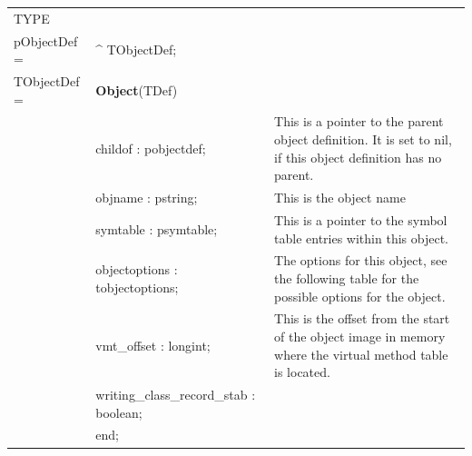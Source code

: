 \documentclass [12pt]{article}
\begin{document}
\begin{tabular*}{6.5in}{|l@{\extracolsep{\fill}}lp{6cm}|}
\hline
\textsf{TYPE}& & \\
\xspace pObjectDef = & \^{}  TObjectDef; & \\
\xspace \textsf{TObjectDef} = & \textbf{Object}(TDef) & \\
&\textsf{childof : pobjectdef;}& 
	This is a pointer to the parent object definition. It is set to nil,
	if this object definition has no parent. \\
&\textsf{objname : pstring;}& 
	This is the object name \\
&\textsf{symtable : psymtable;}& 
	This is a pointer to the symbol table entries within this object. \\
&\textsf{objectoptions : tobjectoptions;}& 
	The options for this object, see the following table for the
	possible options for the object. \\
&\textsf{vmt{\_}offset : longint;}& 
	This is the offset from the start of the object image in memory
	where the virtual method table is located. \\
&\textsf{writing{\_}class{\_}record{\_}stab : boolean;}&  \\
&\textsf{end;}&  \\
\hline
\end{tabular*}
\end{document}

